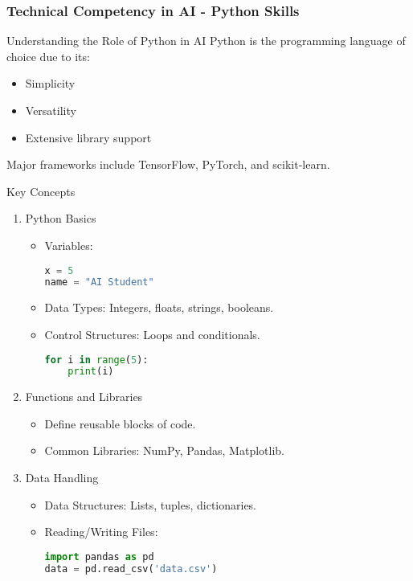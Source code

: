 \documentclass[aspectratio=169]{beamer}
\begin{document}
\begin{frame}[fragile]
    \frametitle{Technical Competency in AI - Python Skills}
    \begin{block}{Understanding the Role of Python in AI}
        Python is the programming language of choice due to its:
        \begin{itemize}
            \item Simplicity
            \item Versatility
            \item Extensive library support
        \end{itemize}
        Major frameworks include TensorFlow, PyTorch, and scikit-learn.
    \end{block}
    
    \begin{block}{Key Concepts}
        \begin{enumerate}
            \item Python Basics
            \begin{itemize}
                \item Variables: 
                \begin{lstlisting}[language=Python]
x = 5
name = "AI Student"
                \end{lstlisting}
                \item Data Types: Integers, floats, strings, booleans.
                \item Control Structures: Loops and conditionals. 
                \begin{lstlisting}[language=Python]
for i in range(5):
    print(i)
                \end{lstlisting}
            \end{itemize}
            \item Functions and Libraries
            \begin{itemize}
                \item Define reusable blocks of code.
                \item Common Libraries: NumPy, Pandas, Matplotlib.
            \end{itemize}
            \item Data Handling
            \begin{itemize}
                \item Data Structures: Lists, tuples, dictionaries.
                \item Reading/Writing Files: 
                \begin{lstlisting}[language=Python]
import pandas as pd
data = pd.read_csv('data.csv')
                \end{lstlisting}
            \end{itemize}
        \end{enumerate}
    \end{block}
\end{frame}
\end{document}
